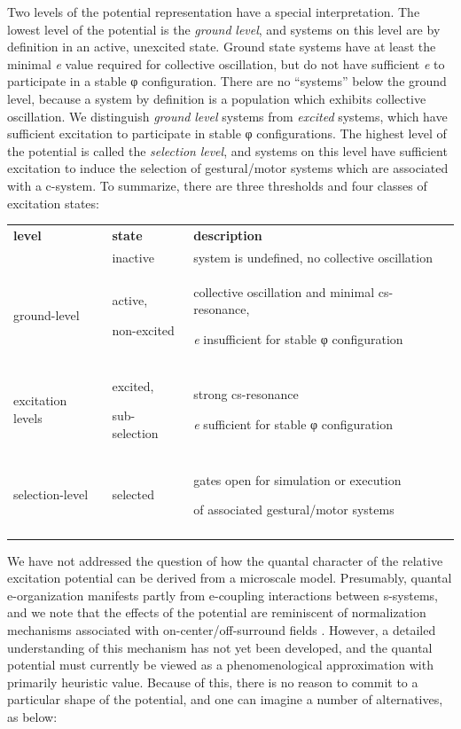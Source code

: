   Two levels of the potential representation have a special  interpretation. The lowest level of the potential is the \textit{ground} \textit{level}, and systems on this level are by definition in an active, unexcited state. Ground state systems have at least the minimal \textit{e} value required for collective oscillation, but do not have sufficient \textit{e} to participate in a stable φ configuration. There are no “systems” below the ground level, because a system by definition is a population which exhibits collective oscillation. We distinguish \textit{ground} \textit{level} systems from \textit{excited} systems, which have sufficient excitation to participate in stable φ configurations. The highest level of the potential is called the \textit{selection} \textit{level}, and systems on this level have sufficient excitation to induce the selection of gestural/motor systems which are associated with a c-system. To summarize, there are three thresholds and four classes of excitation states:

\begin{tabularx}{\textwidth}{XXX}
\lsptoprule
\textbf{level} & \textbf{state} & \textbf{description}\\
& inactive & system is undefined, no collective oscillation\\
\raggedleft ground-level & active,

non-excited & collective oscillation and minimal cs-resonance, 

\textit{e} insufficient for stable φ configuration\\
\raggedleft excitation levels & excited,

sub-selection & strong cs-resonance

\textit{e} sufficient for stable φ configuration\\
\raggedleft selection-level & selected & gates open for simulation or execution 

of associated gestural/motor systems\\
\lspbottomrule
\end{tabularx}
  We have not addressed the question of how the quantal character of the relative excitation potential can be derived from a microscale model. Presumably, quantal e-organization manifests partly from e-coupling interactions between s-systems, and we note that the effects of the potential are reminiscent of normalization mechanisms associated with on-center/off-surround fields \citep{Grossberg1978,Grossberg1987}. However, a detailed understanding of this mechanism has not yet been developed, and the quantal potential must currently be viewed as a phenomenological approximation with primarily heuristic value. Because of this, there is no reason to commit to a particular shape of the potential, and one can imagine a number of alternatives, as below:

